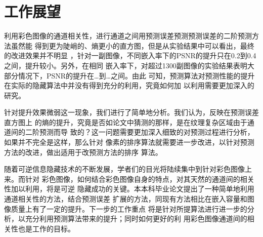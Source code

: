 \section{工作展望}
利用彩色图像的通道相关性，进行通道之间用预测误差预测预测误差的二阶预测方法虽然能
得到更为陡峭的、熵更小的直方图，但是从实验结果中可以看出，最终的改进效果并不明显
，针对一副图像，不同嵌入率下的PSNR的提升只在0.2到0.4之间，提升较小。另外，在相同
嵌入率下，对超过1300副图像的实验结果表明大部分情况下，PSNR的提升在…到…之间。由此
可知，预测算法对预测性能的提升在实际的隐藏算法中并没有得到充分的利用，究竟如何加
以利用需要更加深入的研究。
\par
针对提升效果微弱这一现象，我们进行了简单地分析。我们认为，反映在预测误差直方图上
的熵的提升，究竟是否如论文中猜测的那样，是在纹理复杂区域由于通道间的二阶预测而导
致的？这一问题需要更加深入细致的对预测过程进行分析，如果并不完全是这样，那么针对
像素的排序算法就需要进一步改进，以针对预测方法的改进，做出适用于改预测方法的排序
算法。
\par
随着可逆信息隐藏技术的不断发展，学者们的目光将陆续集中到针对彩色图像上来。而针对
彩色图像，如何结合彩色图像自身的特点，对其天然的通道间的相关性加以利用，将是可逆
隐藏成功的关键。本本科毕业论文提出了一种简单地利用通道相关性的方法，结合预测误差
扩展的方法，同现有方法相比在嵌入容量和图像质量上有了一定的提升。下一步的工作重点
将是针对所提算法进行进一步的分析，以充分利用预测算法带来的提升；同时如何更好的利
用彩色图像通道间的相关性也是工作的目标。
